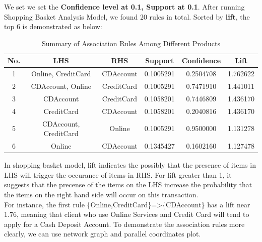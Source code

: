 \documentclass[]{article}
\begin{document}
We set we set the \textbf{Confidence level at 0.1, Support at 0.1}. After running Shopping Basket Analysis Model, we found 20 rules in total. Sorted by \textbf{lift}, the top 6 is demonstrated as below:
\makeatletter\def\@captype{table}\makeatother
\begin{table}[H]
	\centering
	\caption{Summary of Association Rules Among Different Products}
	\begin{tabular}{|c|c|c|c|c|c|} 
	\hline
		No. & LHS & RHS & Support & Confidence & Lift\\ \hline
		1 & Online, CreditCard & CDAccount & 0.1005291 & 0.2504708 & 1.762622\\ \hline
		2 & CDAccount, Online & CreditCard & 0.1005291 & 0.7471910 & 1.441011\\ \hline
		3 & CDAccount & CreditCard & 0.1058201 & 0.7446809 & 1.436170\\ \hline
		4 & CreditCard & CDAccount & 0.1058201 & 0.2040816 & 1.436170\\ \hline
		5 & CDAccount, CreditCard & Online & 0.1005291 & 0.9500000 & 1.131278\\ \hline
		6 & Online & CDAccount & 0.1345427 & 0.1602160 & 1.127478\\ \hline
	\end{tabular}
\end{table}

In shopping basket model, lift indicates the possibly that the presence of items in LHS will trigger the occurance of items in RHS. For lift greater than 1, it suggests that the precense of the items on the LHS increase the probability that the items on the right hand side will occur on this transaction. \\
For instance, the first rule \{Online,CreditCard\}=>\{CDAccount\} has a lift near 1.76, meaning that client who use Online Services and Credit Card will tend to apply for a Cash Deposit Account. 
To demonstrate the association rules more clearly, we can use network graph and parallel coordinates plot.
\end{document}
